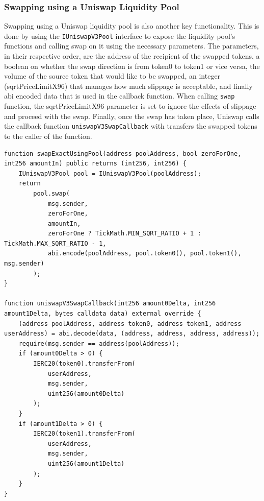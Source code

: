 \subsubsection{Swapping using a Uniswap Liquidity Pool}
Swapping using a Uniswap liquidity pool is also another key functionality. This is done by using the \texttt{IUniswapV3Pool} interface to expose the liquidity pool's functions and calling swap on it using the necessary parameters. The parameters, in their respective order, are the address of the recipient of the swapped tokens, a boolean on whether the swap direction is from token0 to token1 or vice versa, the volume of the source token that would like to be swapped, an integer (sqrtPriceLimitX96) that manages how much slippage is acceptable, and finally abi encoded data that is used in the callback function. When calling \texttt{swap} function, the sqrtPriceLimitX96 parameter is set to ignore the effects of slippage and proceed with the swap. Finally, once the swap has taken place, Uniswap calls the callback function \texttt{uniswapV3SwapCallback} with transfers the swapped tokens to the caller of the function.

\begin{lstlisting}
function swapExactUsingPool(address poolAddress, bool zeroForOne, int256 amountIn) public returns (int256, int256) {
    IUniswapV3Pool pool = IUniswapV3Pool(poolAddress);
    return
        pool.swap(
            msg.sender,
            zeroForOne,
            amountIn,
            zeroForOne ? TickMath.MIN_SQRT_RATIO + 1 : TickMath.MAX_SQRT_RATIO - 1,
            abi.encode(poolAddress, pool.token0(), pool.token1(), msg.sender)
        );
}

function uniswapV3SwapCallback(int256 amount0Delta, int256 amount1Delta, bytes calldata data) external override {
    (address poolAddress, address token0, address token1, address userAddress) = abi.decode(data, (address, address, address, address));
    require(msg.sender == address(poolAddress));
    if (amount0Delta > 0) {
        IERC20(token0).transferFrom(
            userAddress,
            msg.sender,
            uint256(amount0Delta)
        );
    }
    if (amount1Delta > 0) {
        IERC20(token1).transferFrom(
            userAddress,
            msg.sender,
            uint256(amount1Delta)
        );
    }
}
\end{lstlisting}


